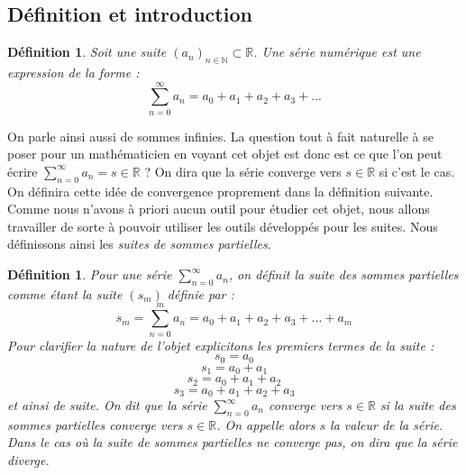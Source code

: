 \documentclass[a4paper, 12pt, french, twoside]{article}
\newtheorem{defi}[theorem]{Définition}
\newcommand{\Nn}{{\mathbb{N}}}
\newcommand{\Rr}{{\mathbb{R}}}
\begin{document}
\subsection{Définition et introduction}
\begin{defi}
    Soit une suite $(a_n)_{n \in \Nn } \subset \Rr$. Une série numérique est une expression de la forme : 
    $$ \sum_{n=0}^{\infty} a_n = a_0 + a_1 + a_2 + a_3 + ... $$
 \end{defi}    
On parle ainsi aussi de sommes infinies. La question tout à fait naturelle à se poser pour un mathématicien en voyant cet objet est donc est ce que l'on peut écrire $\sum_{n=0}^{\infty} a_n = s \in \Rr $ ? On dira que la série converge vers $s \in \Rr$ si c'est le cas. On définira cette idée de convergence proprement dans la définition suivante.
\newline 
Comme nous n'avons à priori aucun outil pour étudier cet objet, nous allons travailler de sorte à pouvoir utiliser les outils développés pour les suites. Nous définissons ainsi les \textit{suites de sommes partielles}. 
\begin{defi}
    Pour une série  $ \sum_{n=0}^{\infty} a_n$, on définit la suite des sommes partielles comme étant la suite $(s_m)$ définie par : $$ s_m = \sum_{n=0}^m  a_n = a_0 + a_1 + a_2 + a_3 + ... + a_m $$
    Pour clarifier la nature de l'objet explicitons les premiers termes de la suite :
    $$ s_0 = a_0$$
    $$ s_1 = a_0 + a_1$$
    $$ s_2 = a_0 + a_1 + a_2$$
    $$ s_3 = a_0 + a_1 + a_2 + a_3$$
    et ainsi de suite.
    On dit que la série  $ \sum_{n=0}^{\infty} a_n$ converge vers  $ s\in \Rr$ si la suite des sommes partielles converge vers $s \in \Rr$. On appelle alors $s$ la valeur de la série. Dans le cas où la suite de sommes partielles ne converge pas, on dira que la série diverge. 
\end{defi}
\end{document}
